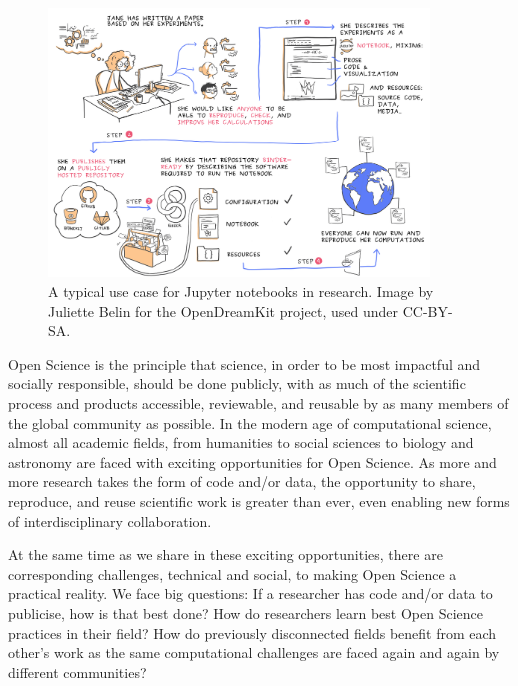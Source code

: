 \begin{figure}[ht]\centering
  \includegraphics[width=0.9\textwidth]{use-cases-binder-logbook-solution.png}
  \caption{A typical use case for Jupyter notebooks in research.
            Image by Juliette Belin for the OpenDreamKit project, used under
            CC-BY-SA.}\label{fig:use-cases-binder}
\end{figure}


Open Science is the principle that science, in order to be most
impactful and socially responsible, should be done publicly, with as
much of the scientific process and products accessible, reviewable,
and reusable by as many members of the global community as possible.
In the modern age of computational science, almost all academic
fields, from humanities to social sciences to biology and astronomy
are faced with exciting opportunities for Open Science.  As more and
more research takes the form of code and/or data, the opportunity to
share, reproduce, and reuse scientific work is greater than ever, even
enabling new forms of interdisciplinary collaboration.

At the same time as we share in these exciting opportunities, there
are corresponding challenges, technical and social, to making Open
Science a practical reality.  We face big questions: If a researcher
has code and/or data to publicise, how is that best done?  How do
researchers learn best Open Science practices in their field?  How do
previously disconnected fields benefit from each other's work as the
same computational challenges are faced again and again by different
communities?

